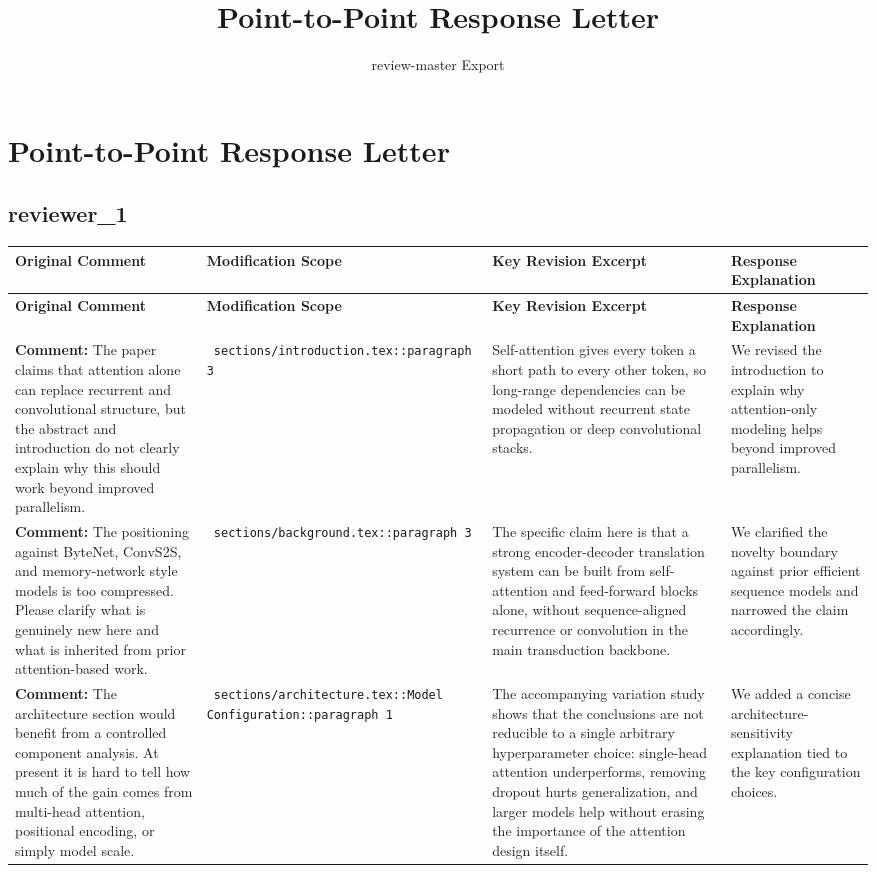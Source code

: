 \documentclass[11pt]{article}
\title{ Point-to-Point Response Letter }
\author{ review-master Export }
\date{}
\begin{document}
\maketitle

\section*{ Point-to-Point Response Letter }

\subsection*{ reviewer\_1 }
\begin{longtable}{|p{}|p{}|p{}|p{}|}
\hline
\textbf{ Original Comment } & \textbf{ Modification Scope } & \textbf{ Key Revision Excerpt } & \textbf{ Response Explanation } \\
\hline
\endfirsthead
\hline
\textbf{ Original Comment } & \textbf{ Modification Scope } & \textbf{ Key Revision Excerpt } & \textbf{ Response Explanation } \\
\hline
\endhead
\textbf{ Comment: } The paper claims that attention alone can replace recurrent and convolutional structure, but the abstract and introduction do not clearly explain why this should work beyond improved parallelism. & \texttt{ sections/introduction.tex::paragraph 3 } & {\color{blue}\ttfamily Self-attention gives every token a short path to every other token, so long-range dependencies can be modeled without recurrent state propagation or deep convolutional stacks.} & We revised the introduction to explain why attention-only modeling helps beyond improved parallelism. \\
\hline
\textbf{ Comment: } The positioning against ByteNet, ConvS2S, and memory-network style models is too compressed. Please clarify what is genuinely new here and what is inherited from prior attention-based work. & \texttt{ sections/background.tex::paragraph 3 } & {\color{blue}\ttfamily The specific claim here is that a strong encoder-decoder translation system can be built from self-attention and feed-forward blocks alone, without sequence-aligned recurrence or convolution in the main transduction backbone.} & We clarified the novelty boundary against prior efficient sequence models and narrowed the claim accordingly. \\
\hline
\textbf{ Comment: } The architecture section would benefit from a controlled component analysis. At present it is hard to tell how much of the gain comes from multi-head attention, positional encoding, or simply model scale. & \texttt{ sections/architecture.tex::Model Configuration::paragraph 1 } & {\color{blue}\ttfamily The accompanying variation study shows that the conclusions are not reducible to a single arbitrary hyperparameter choice: single-head attention underperforms, removing dropout hurts generalization, and larger models help without erasing the importance of the attention design itself.} & We added a concise architecture-sensitivity explanation tied to the key configuration choices. \\

\end{longtable}
\end{document}
